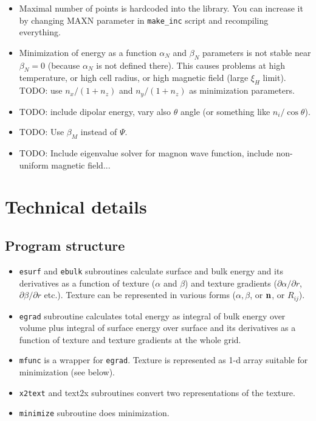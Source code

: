 \documentclass[a4paper]{article}
\begin{document}
\begin{itemize}

\item Maximal number of points is hardcoded into the library. You can
increase it by changing MAXN parameter in {\tt make\_inc} script and
recompiling everything.

\item Minimization of energy as a function $\alpha_N$ and $\beta_N$
parameters is not stable near $\beta_N=0$ (because $\alpha_N$ is not
defined there). This causes problems at high temperature, or high cell
radius, or high magnetic field (large $\xi_H$ limit). TODO: use
$n_x/(1+n_z)$ and $n_y/(1+n_z)$ as minimization parameters.

\item TODO: include dipolar energy, vary also $\theta$ angle (or
something like $n_i/\cos\theta$).

\item TODO: Use $\beta_M$ instead of $\Psi$.

\item TODO: Include eigenvalue solver for magnon wave function,
include non-uniform magnetic field...

\end{itemize}

\eject
\section*{Technical details}

\subsection*{Program structure}

\begin{itemize}
\item {\tt esurf} and {\tt ebulk} subroutines calculate surface and
bulk energy and its derivatives as a function of texture ($\alpha$ and
$\beta$) and texture gradients ($\partial\alpha/\partial r$,
$\partial\beta/\partial r$ etc.). Texture can be represented in various
forms ($\alpha, \beta$, or $\bf n$, or $R_{ij}$).

\item {\tt egrad} subroutine calculates total energy as integral of bulk energy over volume
plus integral of surface energy over surface and its derivatives as a
function of texture and texture gradients at the whole grid.

\item {\tt mfunc} is a wrapper for {\tt egrad}. Texture is represented
as 1-d array suitable for minimization (see below).

\item {\tt x2text} and {text2x} subroutines convert two representations of the texture.

\item {\tt minimize} subroutine does minimization.
\end{itemize}
\end{document}
